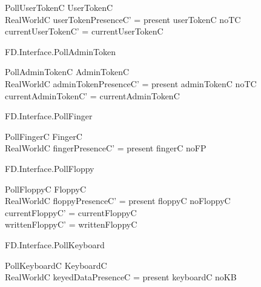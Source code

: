 \begin{schema}{PollUserTokenC}
        \Delta UserTokenC
\\	RealWorldC
\where
	userTokenPresenceC' = present \iff userTokenC \neq noTC
\\	currentUserTokenC' =   currentUserTokenC
\end{schema}

\begin{traceunit}{FD.Interface.PollAdminToken}
\end{traceunit}

\begin{schema}{PollAdminTokenC}
	\Delta AdminTokenC
\\      RealWorldC
\where
	adminTokenPresenceC' = present \iff adminTokenC \neq noTC
\\	currentAdminTokenC' =  currentAdminTokenC
\end{schema}

\begin{traceunit}{FD.Interface.PollFinger}
\end{traceunit}

\begin{schema}{PollFingerC}
	\Delta FingerC
\\	RealWorldC
\where
	fingerPresenceC' = present \iff fingerC \neq noFP
\end{schema}

\begin{traceunit}{FD.Interface.PollFloppy}
\end{traceunit}

\begin{schema}{PollFloppyC}
        \Delta FloppyC
\\      RealWorldC
\where
	floppyPresenceC' = present \iff floppyC \neq noFloppyC
\\      currentFloppyC' =  currentFloppyC
\\      writtenFloppyC' = writtenFloppyC
\end{schema}

\begin{traceunit}{FD.Interface.PollKeyboard}
\end{traceunit}

\begin{schema}{PollKeyboardC}
        \Delta KeyboardC
\\      RealWorldC
\where
        keyedDataPresenceC = present \iff keyboardC \neq noKB
\end{schema}


